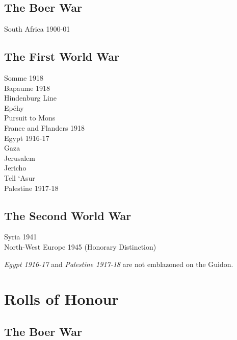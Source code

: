 \section*{The Boer War}

\begin{center}
  South Africa 1900-01
\end{center}

\section*{The First World War}

\begin{center}
  Somme 1918 \\
  Bapaume 1918 \\
  Hindenburg Line \\
  Epéhy \\
  Pursuit to Mons \\
  France and Flanders 1918 \\
  Egypt 1916-17 \\
  Gaza \\
  Jerusalem \\
  Jericho \\
  Tell ‘Asur \\
  Palestine 1917-18
\end{center}

\section*{The Second World War}

\begin{center}
  Syria 1941 \\
  North-West Europe 1945 (Honorary Distinction)
\end{center}

\vspace{1.5cm}

\begin{center}
\noindent
\emph{Egypt 1916-17} and \emph{Palestine 1917-18} are not emblazoned on the Guidon.
\end{center}

\chapter{Rolls of Honour}

\section*{The Boer War}

